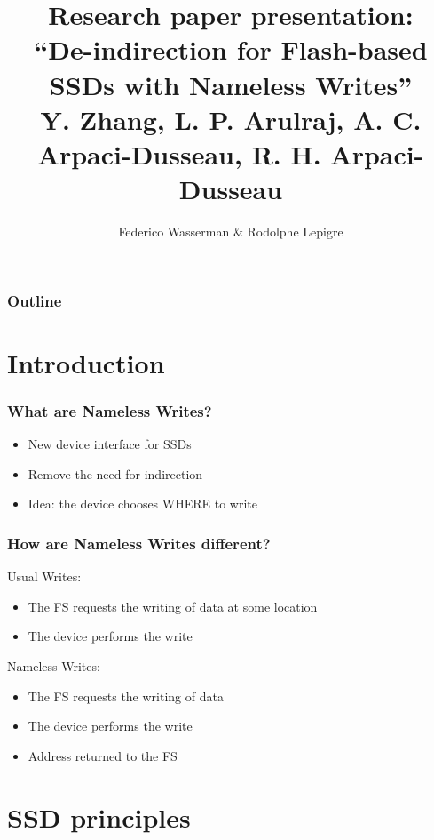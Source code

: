 \documentclass{beamer}
\title[\insertframenumber/\inserttotalframenumber]
      {Research paper presentation:\\
       ``De-indirection for Flash-based SSDs with Nameless Writes''\\
       \small{Y. Zhang, L. P. Arulraj, A. C. Arpaci-Dusseau, R. H. Arpaci-Dusseau}}
\author{Federico Wasserman \& Rodolphe Lepigre}
\institute{MOSIG - Parallel, Distributed and Embedded Systems}
\begin{document}
\begin{frame}
\titlepage
\end{frame}

\begin{frame}
  \frametitle{Outline}
  \tableofcontents[hideallsubsections]
\end{frame}

\section{Introduction}
\begin{frame}
  \frametitle{What are Nameless Writes?}
  \begin{itemize}
    \item New device interface for SSDs
    \item Remove the need for indirection
    \item Idea: the device chooses WHERE to write
  \end{itemize}
\end{frame}

\begin{frame}
  \frametitle{How are Nameless Writes different?}
  Usual Writes:
  \begin{itemize}
    \item The FS requests the writing of data at some location
    \item The device performs the write
  \end{itemize}

  Nameless Writes:
  \begin{itemize}
    \item The FS requests the writing of data
    \item The device performs the write
    \item Address returned to the FS
  \end{itemize}
\end{frame}

\section{SSD principles}
\begin{frame}
\end{frame}
\end{document}
